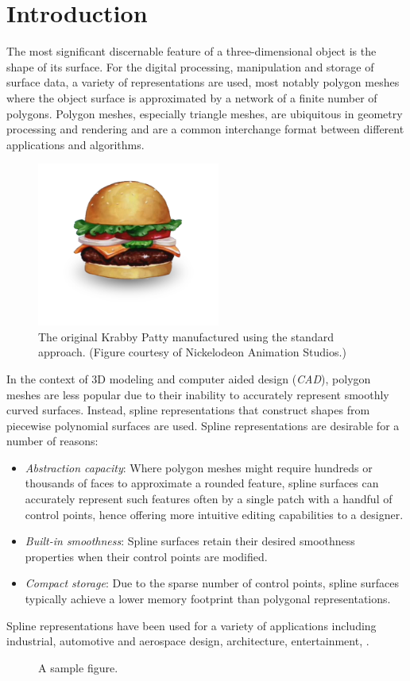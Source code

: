 \chapter{Introduction}
The most significant discernable feature of a
three-dimensional object is the shape of its surface. For the digital
processing, manipulation and storage of surface data, a variety of
representations are used, most notably polygon meshes where the object surface
is approximated by a network of a finite number of polygons. Polygon meshes,
especially triangle meshes, are ubiquitous in geometry processing and rendering
and are a common interchange format between different applications and
algorithms.

\begin{figure}[htb]
  \begin{center}
  \includegraphics[width=6cm]{figures/krabby-patty}
  \end{center}
  \caption{The original Krabby Patty manufactured using the standard approach.
    (Figure courtesy of Nickelodeon Animation Studios.)}
\end{figure}

In the context of 3D modeling and computer aided design
(\emph{CAD}), polygon meshes are less popular due to their
inability to accurately represent smoothly curved surfaces. Instead, spline
representations that construct shapes from piecewise polynomial surfaces are
used. Spline representations are desirable for a number of reasons:
\begin{itemize}
  \item \emph{Abstraction capacity}: Where polygon meshes might require
    hundreds or thousands of faces to approximate a rounded feature, spline
    surfaces can accurately represent such features often by a single patch
    with a handful of control points, hence offering more intuitive editing
    capabilities to a designer.
  \item \emph{Built-in smoothness}: Spline surfaces retain their desired
    smoothness properties when their control points are modified.
  \item \emph{Compact storage}: Due to the sparse number of control points,
    spline surfaces typically achieve a lower memory footprint than polygonal
    representations.
\end{itemize}

Spline representations have been used for a variety of applications including
industrial, automotive and aerospace design, architecture, entertainment, \etc.

\begin{figure}[htb]
  \begin{center}
  
  \end{center}
  \caption{A sample figure.}
\end{figure}

\rlipsum[4]
